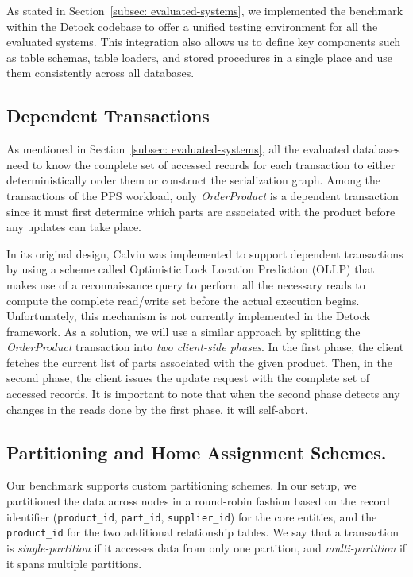 As stated in Section~\ref{subsec: evaluated-systems}, we implemented the benchmark within the Detock codebase to offer a unified testing environment for all the evaluated systems. This integration also allows us to define key components such as table schemas, table loaders, and stored procedures in a single place and use them consistently across all databases.

\subsection{Dependent Transactions}
\label{subsec: dependent-transactions}
As mentioned in Section~\ref{subsec: evaluated-systems}, all the evaluated databases need to know the complete set of accessed records for each transaction to either deterministically order them or construct the serialization graph. Among the transactions of the PPS workload, only \textit{OrderProduct} is a dependent transaction since it must first determine which parts are associated with the product before any updates can take place.

In its original design, Calvin was implemented to support dependent transactions by using a scheme called Optimistic Lock Location Prediction (OLLP) that makes use of a reconnaissance query to perform all the necessary reads to compute the complete read/write set before the actual execution begins. Unfortunately, this mechanism is not currently implemented in the Detock framework. As a solution, we will use a similar approach by splitting the \textit{OrderProduct} transaction into \textit{two client-side phases}. In the first phase, the client fetches the current list of parts associated with the given product. Then, in the second phase, the client issues the update request with the complete set of accessed records. It is important to note that when the second phase detects any changes in the reads done by the first phase, it will self-abort.

\subsection{Partitioning and Home Assignment Schemes.}
\label{subsec: partitioning-and-home-assignment-schemes}
Our benchmark supports custom partitioning schemes. In our setup, we partitioned the data across nodes in a round-robin fashion based on the record identifier (\texttt{product\_id}, \texttt{part\_id}, \texttt{supplier\_id}) for the core entities, and the \texttt{product\_id} for the two additional relationship tables. We say that a transaction is \textit{single-partition} if it accesses data from only one partition, and \textit{multi-partition} if it spans multiple partitions.

